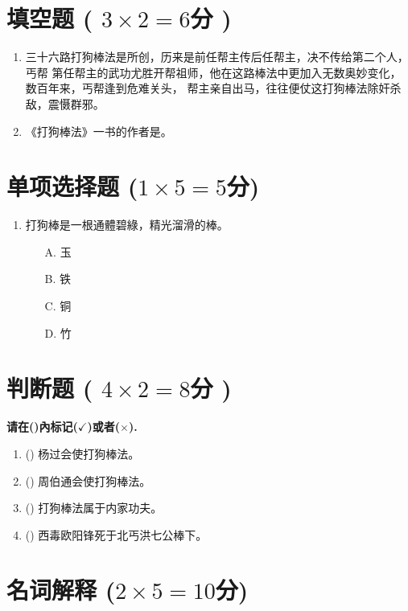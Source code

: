 \documentclass[a3]{swfcexam}
\newcommand{\blank}[1]{\underline{\hspace{#1}}}
\begin{document}
\SWFCheader

\section{填空题 ( $3\times2=6$分 )}

\begin{enumerate}
\item 三十六路打狗棒法是\blank{6em}所创，历来是前任帮主传后任帮主，决不传给第二个人，丐帮
  第\blank{6em}任帮主的武功尤胜开帮祖师，他在这路棒法中更加入无数奥妙变化，数百年来，丐帮逢到危难关头，
  帮主亲自出马，往往便仗这打狗棒法除奸杀敌，震慑群邪。
\item 《打狗棒法》一书的作者是\blank{6em}。
\end{enumerate}
\vfill
\section{单项选择题 ($1\times5=5$分)}
\begin{enumerate}
\item 打狗棒是一根通體碧綠，精光溜滑的\blank{2em}棒。
  \begin{multicols}{4}
    \begin{itemize}
    \item[A.] 玉
    \item[B.] 铁
    \item[C.] 铜
    \item[D.] 竹
    \end{itemize}
  \end{multicols}
\end{enumerate}
\vfill
\section{判断题 ( $4\times2=8$分 )}
\textbf{请在(\blank{1em})內标记(\underline{$\checkmark$})或者(\underline{$\times$}).}
\begin{enumerate}
\item (\blank{1em}) 杨过会使打狗棒法。
\item (\blank{1em}) 周伯通会使打狗棒法。
\item (\blank{1em}) 打狗棒法属于内家功夫。
\item (\blank{1em}) 西毒欧阳锋死于北丐洪七公棒下。
\end{enumerate}
\vfill
\section{名词解释 ($2\times5=10$分)}
\end{document}
